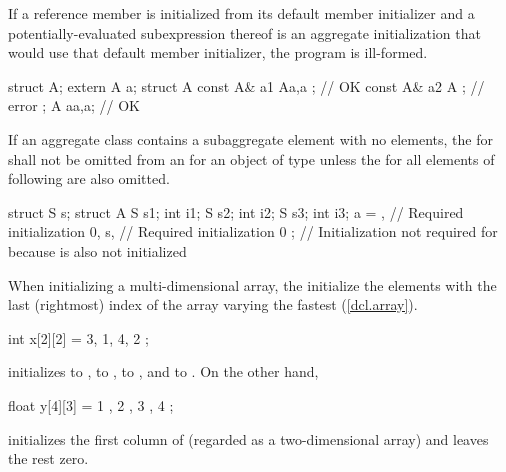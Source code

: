\pnum
If a reference member is initialized from its default member initializer
and a potentially-evaluated subexpression thereof is an aggregate
initialization that would use that default member initializer,
the program is ill-formed.
\begin{example}
\begin{codeblock}
  struct A;
  extern A a;
  struct A {
    const A& a1 { A{a,a} };     // OK
    const A& a2 { A{} };        // error
  };
  A a{a,a};                     // OK
\end{codeblock}
\end{example}

\pnum
If an aggregate class  contains a subaggregate element
 with no elements,
the  for  shall not be
omitted from an  for an object of type
 unless the  for all
elements of  following  are also omitted.
\begin{example}
\begin{codeblock}
struct S { } s;
struct A {
  S s1;
  int i1;
  S s2;
  int i2;
  S s3;
  int i3;
} a = {
  { },              // Required initialization
  0,
  s,                // Required initialization
  0
};                  // Initialization not required for  because  is also not initialized
\end{codeblock}
\end{example}

\pnum
When initializing a multi-dimensional array,
the
initialize the elements with the last (rightmost) index of the array
varying the fastest (\ref{dcl.array}).
\begin{example}

\begin{codeblock}
int x[2][2] = { 3, 1, 4, 2 };
\end{codeblock}

initializes
to
,
to
,
to
,
and
to
.
On the other hand,

\begin{codeblock}
float y[4][3] = {
  { 1 }, { 2 }, { 3 }, { 4 }
};
\end{codeblock}

initializes the first column of
(regarded as a two-dimensional array)
and leaves the rest zero.
\end{example}

